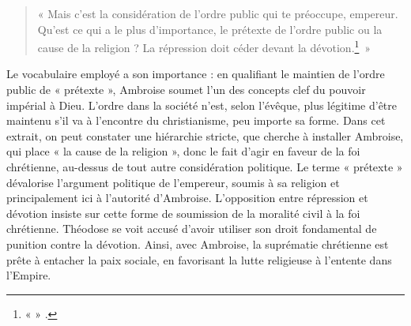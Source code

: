 \bigskip

\begin{quote}
    « Mais c’est la considération de l’ordre public qui te préoccupe, empereur. Qu’est ce qui a le plus d’importance, le prétexte de l’ordre public ou la cause de la religion ? La répression doit céder devant la dévotion.\footnote{«  » \cite[,11]{ambroise_lettres}.}~»
\end{quote}

\bigskip

Le vocabulaire employé a son importance : en qualifiant le maintien de l'ordre public de « prétexte », Ambroise soumet l'un des concepts clef du pouvoir impérial à Dieu. L'ordre dans la société n'est, selon l'évêque, plus légitime d'être maintenu s'il va à l'encontre du christianisme, peu importe sa forme. Dans cet extrait, on peut constater une hiérarchie stricte, que cherche à installer Ambroise, qui place « la cause de la religion », donc le fait d'agir en faveur de la foi chrétienne, au-dessus de tout autre considération politique. Le terme « prétexte » dévalorise l'argument politique de l'empereur, soumis à sa religion et principalement ici à l'autorité d'Ambroise. L'opposition entre répression et dévotion insiste sur cette forme de soumission de la moralité civil à la foi chrétienne. Théodose se voit accusé d'avoir utiliser son droit fondamental de punition contre la dévotion. Ainsi, avec Ambroise, la suprématie chrétienne est prête à entacher la paix sociale, en favorisant la lutte religieuse à l'entente dans l'Empire.

\bigskip

